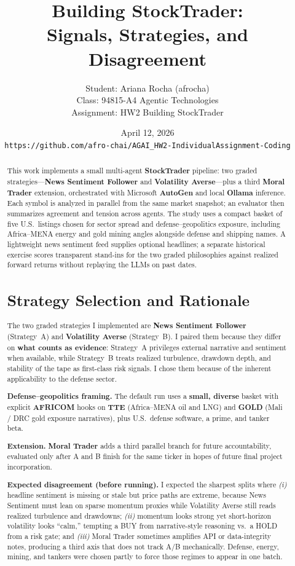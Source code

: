 \documentclass[11pt]{article}
\title{Building StockTrader:\\Signals, Strategies, and Disagreement}
\author{%
  Student: Ariana Rocha (afrocha)\\
  Class: 94815-A4 Agentic Technologies \\
  Assignment: HW2 Building StockTrader \\
}
\date{April 12, 2026 \\
\texttt{https://github.com/afro-chai/AGAI\_HW2-IndividualAssignment-Coding}}
\begin{document}
\maketitle

\begin{abstract}
\noindent This work implements a small multi-agent \textbf{StockTrader} pipeline: two graded strategies---\textbf{News Sentiment Follower} and \textbf{Volatility Averse}---plus a third \textbf{Moral Trader} extension, orchestrated with Microsoft \textbf{AutoGen} and local \textbf{Ollama} inference. Each symbol is analyzed in parallel from the same market snapshot; an evaluator then summarizes agreement and tension across agents. The study uses a compact basket of five U.S.\ listings chosen for sector spread and defense--geopolitics exposure, including Africa--MENA energy and gold mining angles alongside defense and shipping names. A lightweight news sentiment feed supplies optional headlines; a separate historical exercise scores transparent stand-ins for the two graded philosophies against realized forward returns without replaying the LLMs on past dates. 
\section{Strategy Selection and Rationale}

\noindent The two graded strategies I implemented are \textbf{News Sentiment Follower} (Strategy~A) and \textbf{Volatility Averse} (Strategy~B). I paired them because they differ on \textbf{what counts as evidence}: Strategy~A privileges external narrative and sentiment when available, while Strategy~B treats realized turbulence, drawdown depth, and stability of the tape as first-class risk signals. I chose them because of the inherent applicability to the defense sector.

\textbf{Defense--geopolitics framing.} The default run uses a \textbf{small, diverse} basket with explicit \textbf{AFRICOM} hooks on \textbf{TTE} (Africa--MENA oil and LNG) and \textbf{GOLD} (Mali / DRC gold exposure narratives), plus U.S.\ defense software, a prime, and tanker beta.

\textbf{Extension.} \textbf{Moral Trader} adds a third parallel branch for future accountability, evaluated only after A and B finish for the same ticker in hopes of future final project incorporation.

\textbf{Expected disagreement (before running).} I expected the sharpest splits where \emph{(i)} headline sentiment is missing or stale but price paths are extreme, because News Sentiment must lean on sparse momentum proxies while Volatility Averse still reads realized turbulence and drawdowns; \emph{(ii)} momentum looks strong yet short-horizon volatility looks ``calm,'' tempting a BUY from narrative-style reasoning vs.\ a HOLD from a risk gate; and \emph{(iii)} Moral Trader sometimes amplifies API or data-integrity notes, producing a third axis that does not track A/B mechanically. Defense, energy, mining, and tankers were chosen partly to force those regimes to appear in one batch.


\end{abstract}
\end{document}
